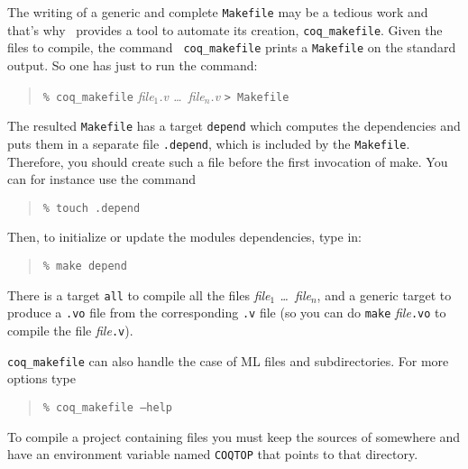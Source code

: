 The writing of a generic and complete {\tt Makefile} may be a tedious work
and that's why \Coq\ provides a tool to automate its creation,
{\tt coq\_makefile}. Given the files to compile, the command {\tt
coq\_makefile} prints a 
{\tt Makefile} on the standard output. So one has just to run the
command:

\begin{quotation}
\texttt{\% coq\_makefile} {\em file$_1$.v \dots\ file$_n$.v} \texttt{> Makefile}
\end{quotation}

The resulted {\tt Makefile} has a target {\tt depend} which computes the
dependencies and puts them in a separate file {\tt .depend}, which is
included by the {\tt Makefile}. 
Therefore, you should create such a file before the first invocation
of make. You can for instance use the command 

\begin{quotation}
\texttt{\% touch .depend}
\end{quotation}

Then, to initialize or update the modules dependencies, type in:

\begin{quotation}
\texttt{\% make depend}
\end{quotation}

There is a target {\tt all} to compile all the files {\em file$_1$
\dots\ file$_n$}, and a generic target to produce a {\tt .vo} file from
the corresponding {\tt .v} file (so you can do {\tt make} {\em file}{\tt.vo}
to compile the file {\em file}{\tt.v}).

{\tt coq\_makefile} can also handle the case of ML files and
subdirectories. For more options type

\begin{quotation}
\texttt{\% coq\_makefile --help}
\end{quotation}

\Warning To compile a project containing \ocaml{} files you must keep
the sources of \Coq{} somewhere and have an environment variable named
\texttt{COQTOP} that points to that directory.



